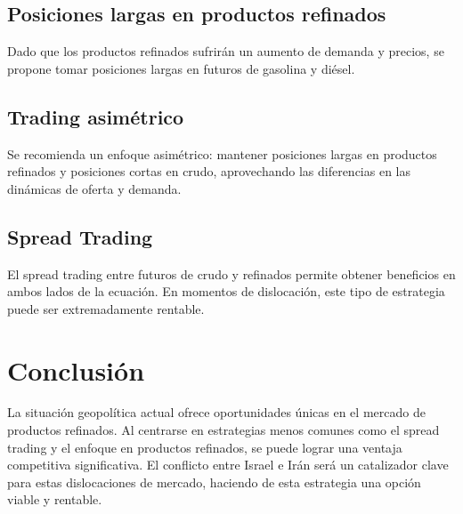 \documentclass[12pt]{article}
\begin{document}
\subsection{Posiciones largas en productos refinados}
Dado que los productos refinados sufrirán un aumento de demanda y precios, se propone tomar posiciones largas en futuros de gasolina y diésel.

\subsection{Trading asimétrico}
Se recomienda un enfoque asimétrico: mantener posiciones largas en productos refinados y posiciones cortas en crudo, aprovechando las diferencias en las dinámicas de oferta y demanda.

\subsection{Spread Trading}
El spread trading entre futuros de crudo y refinados permite obtener beneficios en ambos lados de la ecuación. En momentos de dislocación, este tipo de estrategia puede ser extremadamente rentable.

\section{Conclusión}
La situación geopolítica actual ofrece oportunidades únicas en el mercado de productos refinados. Al centrarse en estrategias menos comunes como el spread trading y el enfoque en productos refinados, se puede lograr una ventaja competitiva significativa. El conflicto entre Israel e Irán será un catalizador clave para estas dislocaciones de mercado, haciendo de esta estrategia una opción viable y rentable.
\end{document}
